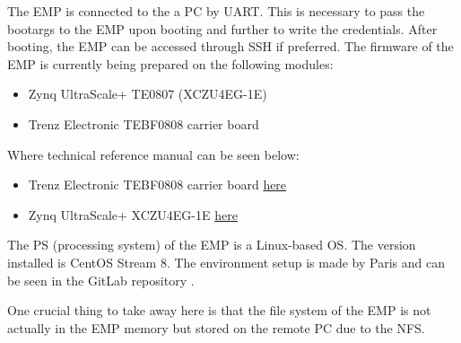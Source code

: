\noindent The EMP is connected to the a PC by UART. This is necessary to pass the bootargs to the EMP upon booting and further to write the credentials. After booting, the EMP can be accessed through SSH if preferred. The firmware of the EMP is currently being prepared on the following modules:
\begin{itemize}
\vspace{-0.1 cm}
    \item Zynq UltraScale+ TE0807 (XCZU4EG-1E) \cite{MPSoCMod51:online}
    \vspace{-0.2 cm}
    \item Trenz Electronic TEBF0808 carrier board \cite{TrenzEle6:online}
\end{itemize}
\vspace{0.2 cm}
\noindent Where technical reference manual can be seen below:
\begin{itemize}
\vspace{-0.1 cm}
    \item Trenz Electronic TEBF0808 carrier board \href{https://wiki.trenz-electronic.de/display/PD/TEBF0808+TRM}{here}
\vspace{-0.2 cm}
    \item Zynq UltraScale+ XCZU4EG-1E \href{https://wiki.trenz-electronic.de/display/PD/TE0807+TRM}{here}
\end{itemize}
\vspace{0.2 cm}
\noindent The PS (processing system) of the EMP is a Linux-based OS. The version installed is CentOS Stream 8. The environment setup is made by Paris and can be seen in the GitLab repository \cite{EMCIEMPe95:online}. 

\noindent One crucial thing to take away here is that the file system of the EMP is not actually in the EMP memory but stored on the remote PC due to the NFS. 

